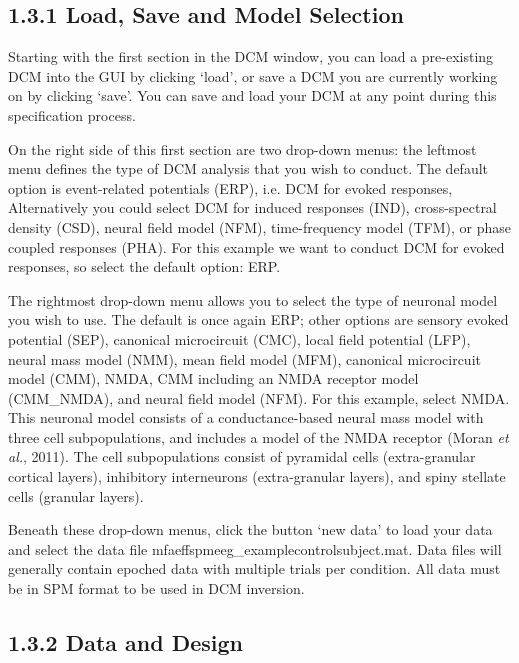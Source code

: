 \subsection{\texorpdfstring{\textbf{1.3.1 Load, Save and Model
Selection}}{1.3.1 Load, Save and Model Selection}}\label{load-save-and-model-selection}

Starting with the first section in the DCM window, you can load a
pre-existing DCM into the GUI by clicking `load', or save a DCM you are
currently working on by clicking `save'. You can save and load your DCM
at any point during this specification process.

On the right side of this first section are two drop-down menus: the
leftmost menu defines the type of DCM analysis that you wish to conduct.
The default option is event-related potentials (ERP), i.e. DCM for
evoked responses, Alternatively you could select DCM for induced
responses (IND), cross-spectral density (CSD), neural field model (NFM),
time-frequency model (TFM), or phase coupled responses (PHA). For this
example we want to conduct DCM for evoked responses, so select the
default option: ERP.

The rightmost drop-down menu allows you to select the type of neuronal
model you wish to use. The default is once again ERP; other options are
sensory evoked potential (SEP), canonical microcircuit (CMC), local
field potential (LFP), neural mass model (NMM), mean field model (MFM),
canonical microcircuit model (CMM), NMDA, CMM including an NMDA receptor
model (CMM\_NMDA), and neural field model (NFM). For this example,
select NMDA. This neuronal model consists of a conductance-based neural
mass model with three cell subpopulations, and includes a model of the
NMDA receptor (Moran \emph{et al.}, 2011). The cell subpopulations
consist of pyramidal cells (extra-granular cortical layers), inhibitory
interneurons (extra-granular layers), and spiny stellate cells (granular
layers).

Beneath these drop-down menus, click the button `new data' to load your
data and select the data file mfaeffspmeeg\_examplecontrolsubject.mat.
Data files will generally contain epoched data with multiple trials per
condition. All data must be in SPM format to be used in DCM inversion.

\subsection{\texorpdfstring{\textbf{1.3.2 Data and
Design}}{1.3.2 Data and Design}}\label{data-and-design}

